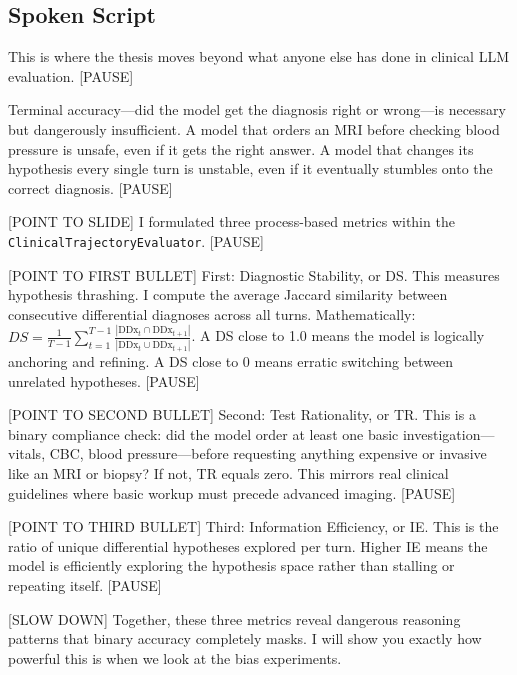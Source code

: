 \documentclass[12pt]{article}
\begin{document}
  \subsection*{Spoken Script}
  \begin{spokenbox}
   This is where the thesis moves beyond what anyone else has done in clinical LLM evaluation. [PAUSE]

  Terminal accuracy---did the model get the diagnosis right or wrong---is necessary but dangerously insufficient. A model that orders an MRI before checking blood pressure is unsafe, even if it gets the right answer. A model that changes its hypothesis every single turn is unstable, even if it eventually stumbles onto the correct diagnosis. [PAUSE]

  [POINT TO SLIDE] I formulated three process-based metrics within the \texttt{ClinicalTrajectoryEvaluator}. [PAUSE]

  [POINT TO FIRST BULLET] First: Diagnostic Stability, or DS. This measures hypothesis thrashing. I compute the average Jaccard similarity between consecutive differential diagnoses across all turns. Mathematically: $DS = \frac{1}{T-1} \sum_{t=1}^{T-1} \frac{|\text{DDx}_t \cap \text{DDx}_{t+1}|}{|\text{DDx}_t \cup \text{DDx}_{t+1}|}$. A DS close to 1.0 means the model is logically anchoring and refining. A DS close to 0 means erratic switching between unrelated hypotheses. [PAUSE]

  [POINT TO SECOND BULLET] Second: Test Rationality, or TR. This is a binary compliance check: did the model order at least one basic investigation---vitals, CBC, blood pressure---before requesting anything expensive or invasive like an MRI or biopsy? If not, TR equals zero. This mirrors real clinical guidelines where basic workup must precede advanced imaging. [PAUSE]

  [POINT TO THIRD BULLET] Third: Information Efficiency, or IE. This is the ratio of unique differential hypotheses explored per turn. Higher IE means the model is efficiently exploring the hypothesis space rather than stalling or repeating itself. [PAUSE]

  [SLOW DOWN] Together, these three metrics reveal dangerous reasoning patterns that binary accuracy completely masks. I will show you exactly how powerful this is when we look at the bias experiments.
  \end{spokenbox}
\end{document}
